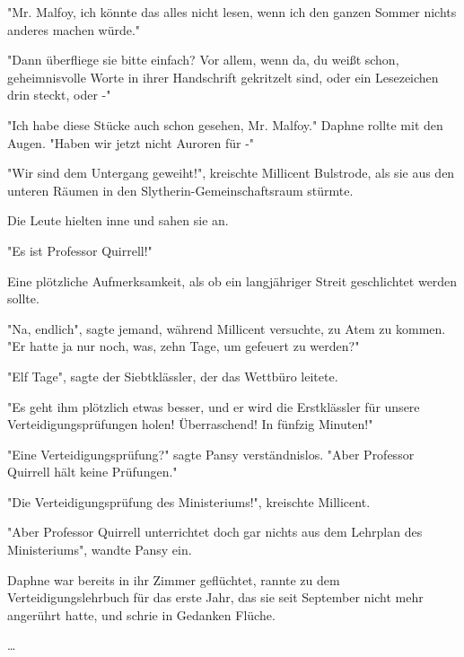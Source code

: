 {"Mr. Malfoy, ich könnte das alles nicht lesen, wenn ich den ganzen Sommer nichts anderes machen würde."

"Dann überfliege sie bitte einfach? Vor allem, wenn da, du weißt schon, geheimnisvolle Worte in ihrer Handschrift gekritzelt sind, oder ein Lesezeichen drin steckt, oder -"

"Ich habe diese Stücke auch schon gesehen, Mr. Malfoy." Daphne rollte mit den Augen. "Haben wir jetzt nicht Auroren für -"

"Wir sind dem Untergang geweiht!", kreischte Millicent Bulstrode, als sie aus den unteren Räumen in den Slytherin-Gemeinschaftsraum stürmte.

Die Leute hielten inne und sahen sie an.

"Es ist Professor Quirrell!"

Eine plötzliche Aufmerksamkeit, als ob ein langjähriger Streit geschlichtet werden sollte.

"Na, endlich", sagte jemand, während Millicent versuchte, zu Atem zu kommen. "Er hatte ja nur noch, was, zehn Tage, um gefeuert zu werden?"

"Elf Tage", sagte der Siebtklässler, der das Wettbüro leitete.

"Es geht ihm plötzlich etwas besser, und er wird die Erstklässler für unsere Verteidigungsprüfungen holen! Überraschend! In fünfzig Minuten!"

"Eine Verteidigungsprüfung?" sagte Pansy verständnislos. "Aber Professor Quirrell hält keine Prüfungen."

"Die Verteidigungsprüfung des Ministeriums!", kreischte Millicent.

"Aber Professor Quirrell unterrichtet doch gar nichts aus dem Lehrplan des Ministeriums", wandte Pansy ein.

Daphne war bereits in ihr Zimmer geflüchtet, rannte zu dem Verteidigungslehrbuch für das erste Jahr, das sie seit September nicht mehr angerührt hatte, und schrie in Gedanken Flüche.

…

}
